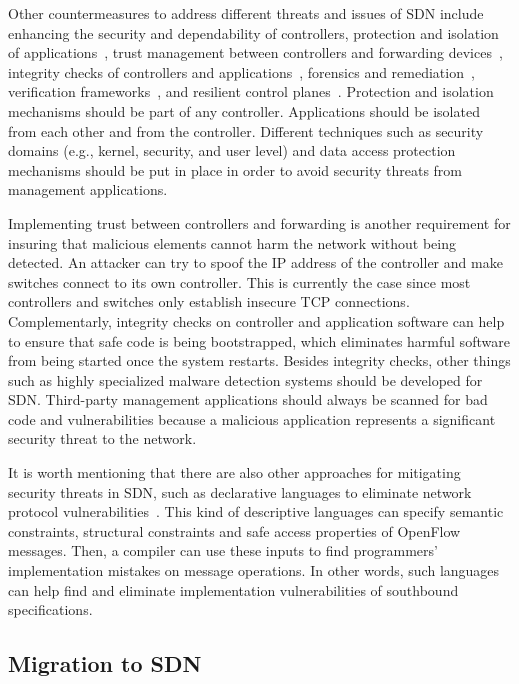 Other countermeasures to address different threats and issues of SDN include enhancing the security and 
dependability of controllers, protection and isolation of applications~\cite{sorensen2012,kreutz2013,porras2012}, trust management between controllers 
and forwarding devices~\cite{kreutz2013}, integrity checks of controllers and applications~\cite{kreutz2013}, forensics and remediation~\cite{sorensen2012,kreutz2013}, 
verification frameworks~\cite{chua2013,porras2012,korniak2011}, and resilient control planes~\cite{fonseca2012,korniak2011,kreutz2013,sorensen2012}.
Protection and isolation mechanisms should be part of any controller. Applications should be isolated from each other and from the controller. 
Different techniques such as security domains (e.g., kernel, security, and user level) and data access protection mechanisms should be put in place in order to avoid security threats from management applications. 

Implementing trust between controllers and forwarding is another requirement for insuring that malicious elements 
cannot harm the network without being detected. 
An attacker can try to spoof the IP address of the controller and make switches connect to its own controller. 
This is currently the case since most controllers and switches only establish insecure TCP connections. 
Complementarly, integrity checks on controller and application software can help to ensure that safe code is being bootstrapped, which eliminates harmful software from being started once the system restarts. 
Besides integrity checks, other things such as highly specialized malware detection systems should be developed for SDN. 
Third-party management applications should always be scanned for bad code and vulnerabilities because a malicious application represents a significant security threat to the network. 

It is worth mentioning that there are also other approaches for mitigating security threats in SDN, such as declarative languages to eliminate network 
protocol vulnerabilities~\cite{casey2013}. 
This kind of descriptive languages can specify semantic constraints, structural constraints and safe access properties of OpenFlow messages. 
Then, a compiler can use these inputs to find programmers' implementation mistakes on message operations. 
In other words, such languages can help find and eliminate implementation vulnerabilities of southbound specifications.

\subsection{Migration to SDN}
\label{sec:hybrid}

